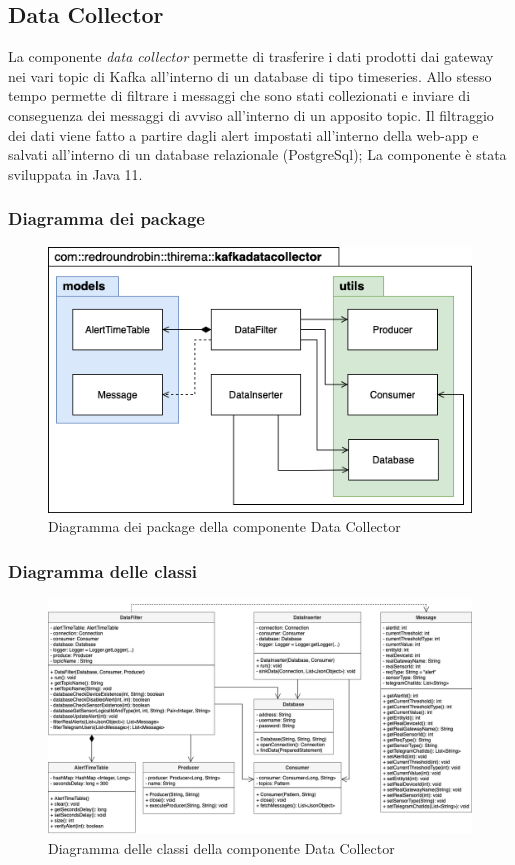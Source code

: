 \subsection{Data Collector}
La componente \textit{data collector} permette di trasferire i dati prodotti dai gateway nei vari topic di Kafka all'interno di un database di tipo timeseries. Allo stesso tempo permette di filtrare i messaggi che sono stati collezionati e inviare di conseguenza dei messaggi di avviso all'interno di un apposito topic.
Il filtraggio dei dati viene fatto a partire dagli alert impostati all'interno della web-app e salvati all'interno di un database relazionale (PostgreSql);
La componente è stata sviluppata in Java 11.
	\subsubsection{Diagramma dei package}%
	\begin{figure}[H]
			\centering
			\includegraphics[scale=0.600]{res/images/DATACOLLECTOR/Packagekafkadatacollector.png}
			\caption{Diagramma dei package della componente Data Collector}
		\end{figure}
	\begin{landscape}
	\subsubsection{Diagramma delle classi}%
		\begin{figure}[H]
			\centering
			\includegraphics[scale=0.550]{res/images/DATACOLLECTOR/ClassikafkaDataCollector.png}
			\caption{Diagramma delle classi della componente Data Collector}
		\end{figure}
	\end{landscape}
